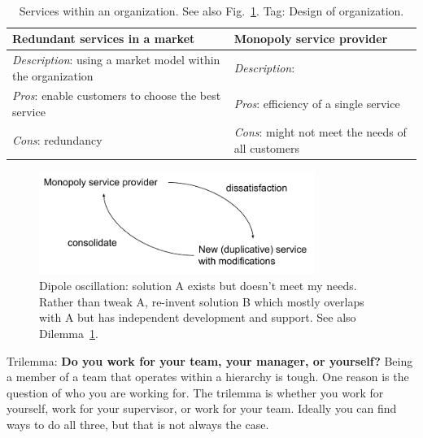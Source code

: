 \ \\

\begin{center}
\begin{table}[ht]
\begin{tabular}{ | m{\dilemmatablewidth}| m{\dilemmatablewidth} | } 
  \hline
  \textbf{Redundant services in a market} &
  \textbf{Monopoly service provider} \\
  \hline
  \textit{Description}: using a market model within the organization &
  \textit{Description}:  \\  
  \hline
  \textit{Pros}: enable customers to choose the best service &
  \textit{Pros}: efficiency of a single service \\
  \hline
  \textit{Cons}: redundancy & 
  \textit{Cons}: might not meet the needs of all customers \\
  \hline
\end{tabular}
\caption{Services within an organization. See also Fig.~\ref{fig:market-vs-monopoly}.
{\tiny Tag: Design of organization.}
}
\label{table:market-vs-monopoly}
\end{table}
\end{center}


\begin{figure}[ht]
    \centering
    \includegraphics[width=0.8\textwidth]{images/dilemma_market_vs_monopoly.pdf}
    \caption{Dipole oscillation: solution A exists but doesn't meet my needs. Rather than tweak A, re-invent solution B which mostly overlaps with A but has independent development and support. See also Dilemma~\ref{table:market-vs-monopoly}.}
    \label{fig:market-vs-monopoly}
\end{figure}


Trilemma: \textbf{Do you work for your team, your manager, or yourself?}
Being a member of a team that operates within a hierarchy is tough. One reason is the question of who you are working for. The trilemma is whether you work for yourself, work for your supervisor, or work for your team.  Ideally you can find ways to do all three, but that is not always the case. 

